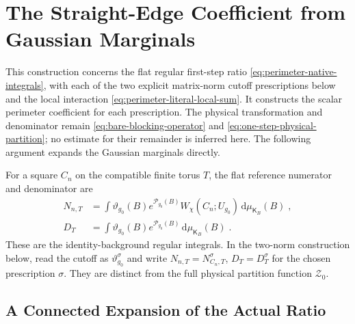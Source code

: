 \documentclass[11pt]{article}
\newcommand{\dd}{\mathrm{d}}
\begin{document}
\section{The Straight-Edge Coefficient from Gaussian Marginals}
\label{sec:marginal-perimeter}

This construction concerns the flat regular first-step ratio \eqref{eq:perimeter-native-integrals}, with each of the two explicit matrix-norm cutoff prescriptions below and the local interaction \eqref{eq:perimeter-literal-local-sum}. It constructs the scalar perimeter coefficient for each prescription. The physical transformation and denominator remain \eqref{eq:bare-blocking-operator} and \eqref{eq:one-step-physical-partition}; no estimate for their remainder is inferred here. The following argument expands the Gaussian marginals directly.

For a square $C_n$ on the compatible finite torus $T$, the flat reference numerator and denominator are
\begin{equation}\label{eq:perimeter-native-integrals}
    \begin{aligned}
        N_{n,T}&=\int\vartheta_{g_0}(B)e^{\mathcal P_{g_0}(B)}
            W_\chi(C_n;U_{g_0})\,\dd\mu_{\mathsf K_B}(B)\;,\\
        D_T&=\int\vartheta_{g_0}(B)e^{\mathcal P_{g_0}(B)}
            \,\dd\mu_{\mathsf K_B}(B)\;.
    \end{aligned}
\end{equation}
These are the identity-background regular integrals. In the two-norm construction below, read the cutoff as $\vartheta_{g_0}^{\sigma}$ and write $N_{n,T}=N_{C_n,T}^{\sigma}$, $D_T=D_T^{\sigma}$ for the chosen prescription $\sigma$. They are distinct from the full physical partition function $\mathcal Z_0$.
\subsection{A Connected Expansion of the Actual Ratio}
\end{document}
